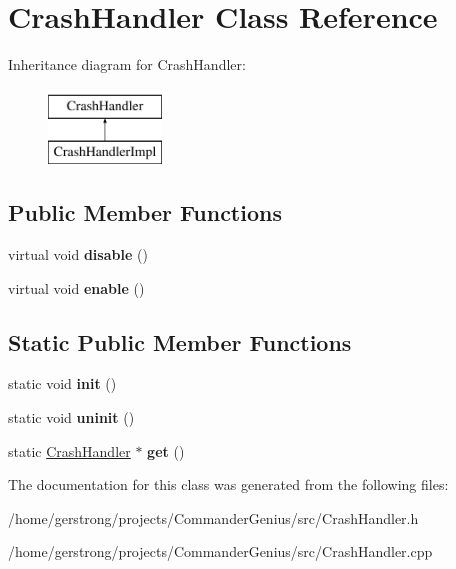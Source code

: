 \hypertarget{class_crash_handler}{
\section{CrashHandler Class Reference}
\label{class_crash_handler}
}
Inheritance diagram for CrashHandler:\begin{figure}[H]
\begin{center}
\leavevmode
\includegraphics[height=2cm]{class_crash_handler}
\end{center}
\end{figure}
\subsection*{Public Member Functions}
\begin{DoxyCompactItemize}
\item 
\hypertarget{class_crash_handler_a1bde89725f2de16f96fb50534ed7fb47}{
virtual void {\bfseries disable} ()}
\label{class_crash_handler_a1bde89725f2de16f96fb50534ed7fb47}

\item 
\hypertarget{class_crash_handler_a08c0a94c13cf6dbb238d09e3e2a5c30e}{
virtual void {\bfseries enable} ()}
\label{class_crash_handler_a08c0a94c13cf6dbb238d09e3e2a5c30e}

\end{DoxyCompactItemize}
\subsection*{Static Public Member Functions}
\begin{DoxyCompactItemize}
\item 
\hypertarget{class_crash_handler_ac8c64236da29168470471ed2ada90f99}{
static void {\bfseries init} ()}
\label{class_crash_handler_ac8c64236da29168470471ed2ada90f99}

\item 
\hypertarget{class_crash_handler_aa7e448ed61a4e00bcb8fa0c0ff3d7474}{
static void {\bfseries uninit} ()}
\label{class_crash_handler_aa7e448ed61a4e00bcb8fa0c0ff3d7474}

\item 
\hypertarget{class_crash_handler_a3bac50f0799ed24603911218e2d0c3cb}{
static \hyperlink{class_crash_handler}{CrashHandler} $\ast$ {\bfseries get} ()}
\label{class_crash_handler_a3bac50f0799ed24603911218e2d0c3cb}

\end{DoxyCompactItemize}


The documentation for this class was generated from the following files:\begin{DoxyCompactItemize}
\item 
/home/gerstrong/projects/CommanderGenius/src/CrashHandler.h\item 
/home/gerstrong/projects/CommanderGenius/src/CrashHandler.cpp\end{DoxyCompactItemize}
